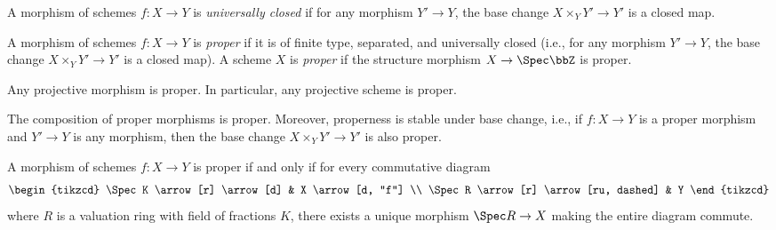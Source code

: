     \begin{definition}\label{def:universally_closed_morphism}
        A morphism of schemes \(f : X \to Y\) is \emph{universally closed} if for any morphism \(Y' \to Y\), the base change \(X \times_Y Y' \to Y'\) is a closed map.
    \end{definition}

    \begin{definition}\label{def:proper_morphism_and_proper_scheme}
        A morphism of schemes \(f : X \to Y\) is \emph{proper} if it is of finite type, separated, and universally closed (i.e., for any morphism \(Y' \to Y\), the base change \(X \times_Y Y' \to Y'\) is a closed map).
        A scheme \(X\) is \emph{proper} if the structure morphism \(X \to \Spec \bbZ\) is proper.
    \end{definition}

    \begin{theorem}\label{prop:projective_morphism_is_proper}
        Any projective morphism is proper.
        In particular, any projective scheme is proper.
    \end{theorem}

    \begin{proposition}\label{prop:composition_and_base_change_of_proper_morphisms}
        The composition of proper morphisms is proper.
        Moreover, properness is stable under base change, i.e., if \(f : X \to Y\) is a proper morphism and \(Y' \to Y\) is any morphism, then the base change \(X \times_Y Y' \to Y'\) is also proper.
        
    \end{proposition}

    \begin{proposition}\label{prop:valuative_criterion_of_properness}
        A morphism of schemes \(f : X \to Y\) is proper if and only if for every commutative diagram
        \[
            \begin{tikzcd}
                \Spec K \arrow[r] \arrow[d] & X \arrow[d, "f"] \\
                \Spec R \arrow[r] \arrow[ru, dashed] & Y
            \end{tikzcd}
        \]
        where \(R\) is a valuation ring with field of fractions \(K\), there exists a unique morphism \(\Spec R \to X\) making the entire diagram commute.
        
    \end{proposition}

